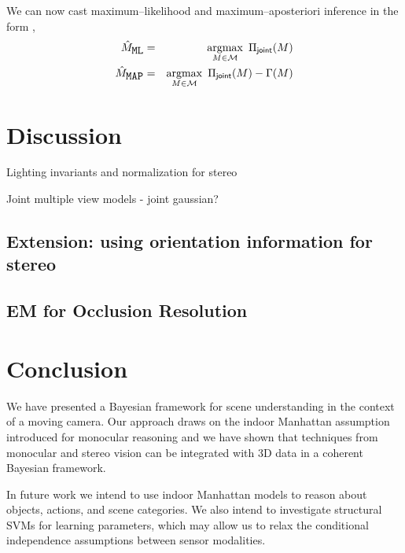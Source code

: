 We can now cast maximum--likelihood and maximum--aposteriori inference
in the form ,
\begin{eqnarray}
  \EstimatedScene_{\mbox{\tt ML}} &=& 
    \argmax_{\Scene\in\SetOfScenes}\limits~
    \ScenePayoff_{\textsf{joint}}(\Scene)\\
  \EstimatedScene_{\mbox{\tt MAP}} &=& 
  \argmax_{\Scene\in\SetOfScenes}\limits~
  \ScenePayoff_{\textsf{joint}}(\Scene) - \ScenePenalty(\Scene)\\
\end{eqnarray}

\section{Discussion}

Lighting invariants and normalization for stereo

Joint multiple view models - joint gaussian?

\subsection{Extension: using orientation information for stereo}

\subsection{EM for Occlusion Resolution}

\section{Conclusion}
We have presented a Bayesian framework for scene understanding in the
context of a moving camera. Our approach draws on the indoor Manhattan
assumption introduced for monocular reasoning and we have shown that
techniques from monocular and stereo vision can be integrated with 3D
data in a coherent Bayesian framework.

In future work we intend to use indoor Manhattan models to reason
about objects, actions, and scene categories. We also intend to
investigate structural SVMs for learning parameters, which may allow
us to relax the conditional independence assumptions between sensor
modalities.
